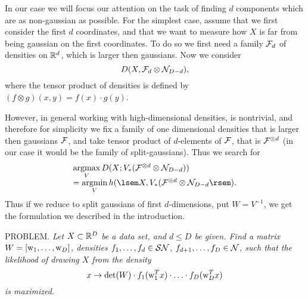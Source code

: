 In our case we will focus our attention on the task of finding $d$ components which are as non-gaussian as possible. For the simplest case, assume that we first consider the first $d$ coordinates, 
and that we want to measure how $X$ is far from being gaussian on the first coordinates. To do so we first need a family $\mathcal{F}_d$ of densities on $\mathbb{R}^d$, which is larger then gaussians. Now we consider
$$
D(X,\mathcal{F}_d \otimes \mathcal{N}_{D-d}),
$$
where the tensor product of densities is defined by $(f \otimes g)(x,y)=f(x) \cdot g(y)$.

However, in general working with high-dimensional densities, is nontrivial, and therefore for simplicity we fix a family of one dimensional densities that is larger then gaussians $\mathcal{F}$, and take tensor product of $d$-elements of $\mathcal{F}$, that is $\mathcal{F}^{\otimes d}$ (in our case it would be the family of split-gaussians). Thus we search for
$$
\begin{array}{l}
\argmax \limits_V D(X;V_*(\F^{\otimes d} \otimes \nor_{D-d})) \\[1ex]
=\argmin \limits_V h(\de{X,V_*(\F^{\otimes d} \otimes \nor_{D-d}}).
\end{array}
$$
Thus if we reduce to split gaussians of first $d$-dimensions, put $W=V^{-1}$, we get the formulation we described in the introduction.

\medskip

\noindent PROBLEM. {\em Let $X \subset \mathbb{R}^D$ be a data set, and $d \leq D$ be given.
Find a matrix $W=[\mathrm{w}_1,\ldots,\mathrm{w}_D]$, densities $f_1,\ldots,f_d \in \mathcal{SN}$, $f_{d+1},\ldots,f_D \in \mathcal{N}$, such that 
the likelihood of drawing $X$ from the density
$$
x \to \det(W) \cdot f_1(\mathrm{w}_1^Tx) \cdot \ldots \cdot f_D(\mathrm{w}_D^T x)
$$
is maximized.}

\medskip

